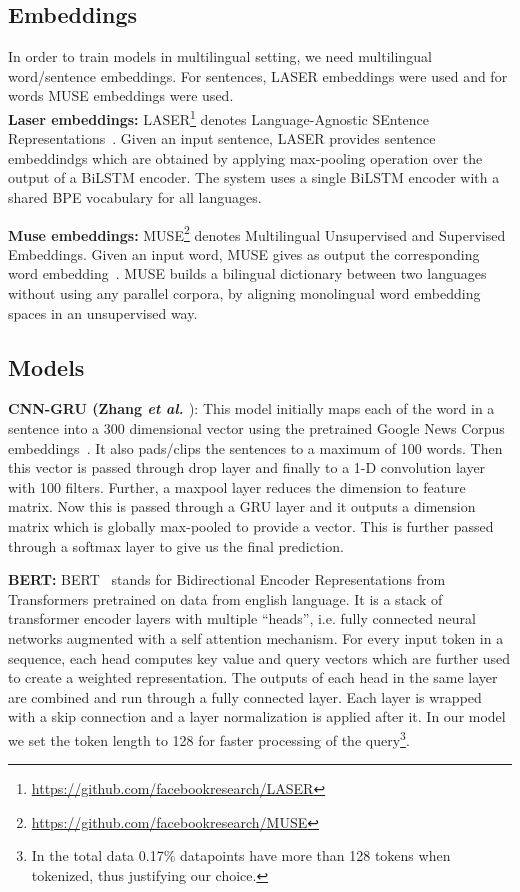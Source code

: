 \documentclass[runningheads]{llncs}
\begin{document}
\subsection{Embeddings}
In order to train models in multilingual setting, we need multilingual word/sentence embeddings. For sentences, LASER embeddings were used and for words MUSE embeddings were used.\\
\textbf{Laser embeddings:} LASER\footnote{\url{https://github.com/facebookresearch/LASER}} denotes Language-Agnostic SEntence Representations~\cite{artetxe2019massively}. Given an input sentence, LASER provides sentence embeddindgs which are obtained by applying max-pooling operation over the output of a BiLSTM  encoder. The system uses a single BiLSTM encoder with a shared BPE vocabulary for all languages.


\noindent\textbf{Muse embeddings:} MUSE\footnote{\url{https://github.com/facebookresearch/MUSE}} denotes Multilingual Unsupervised and Supervised Embeddings. Given an input word, MUSE gives as output the  corresponding word embedding~\cite{conneau2017word}. MUSE builds a bilingual dictionary between two languages without using any parallel corpora, by aligning monolingual word embedding spaces in an unsupervised way.


\subsection{Models}

\textbf{CNN-GRU (Zhang \textit{et al.} \cite{zhang2018detecting}}): This model initially maps each of the word in a sentence into a 300 dimensional vector using the pretrained Google News Corpus embeddings~\cite{mikolov2013efficient}. It also pads/clips the sentences to a maximum of 100 words. Then this  vector is passed through drop layer and finally to a 1-D convolution layer with 100 filters. Further, a maxpool layer reduces the dimension to  feature matrix. Now this is passed through a GRU layer and it outputs a  dimension matrix which is globally max-pooled to provide a  vector. This is further passed through a softmax layer to give us the final prediction.

\noindent\textbf{BERT:} BERT~\cite{devlin2018bert} stands for Bidirectional Encoder Representations from Transformers pretrained on data from english language. It is a stack of transformer encoder layers with multiple ``heads'', i.e. fully connected neural networks augmented with a self attention mechanism. For every input token in a sequence, each head computes key value and query vectors which are further used to create a weighted representation. The outputs of each head in the same layer are combined and run through a fully connected layer. Each layer is wrapped with a skip connection and a layer normalization is applied after it. In our model we set the token length to 128 for faster processing of the query\footnote{In the total data 0.17\% datapoints have more than 128 tokens when tokenized, thus justifying our choice.}.
\end{document}

